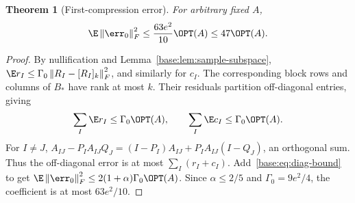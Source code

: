 \documentclass[11pt,oneside,openany,a4paper]{book}
\numberwithin{equation}{chapter}
\newtheorem{theorem}{Theorem}[chapter]
\theoremstyle{definition}
\theoremstyle{remark}
\newcommand{\F}[1]{\left\lVert#1\right\rVert_F}
\begin{document}
\begin{theorem}[First-compression error]\label{base:thm:first-error}
For arbitrary fixed $A$,
\begin{equation}\label{base:eq:first-error}
 \E\F{\err_0}^2
 \le\frac{63e^2}{10}\OPT(A)\le47\OPT(A).
\end{equation}
\end{theorem}
\begin{proof}
By nullification and Lemma~\ref{base:lem:sample-subspace},
$\E r_I\le\Gamma_0\F{R_I-[R_I]_k}^2$, and similarly for $c_I$.
The corresponding block rows and columns of $B_*$ have rank at most $k$.
Their residuals partition off-diagonal entries, giving
\begin{equation}\label{base:eq:sum-r-c}
 \sum_I\E r_I\le\Gamma_0\OPT(A),\qquad
 \sum_I\E c_I\le\Gamma_0\OPT(A).
\end{equation}
For $I\ne J$,
$A_{IJ}-P_IA_{IJ}Q_J=(I-P_I)A_{IJ}+P_IA_{IJ}(I-Q_J)$,
an orthogonal sum. Thus the off-diagonal error is at most
$\sum_I(r_I+c_I)$. Add~\eqref{base:eq:diag-bound} to get
$\E\F{\err_0}^2\le2(1+\alpha)\Gamma_0\OPT(A)$.
Since $\alpha\le2/5$ and $\Gamma_0=9e^2/4$, the coefficient is at most
$63e^2/10$.\end{proof}
\end{document}
